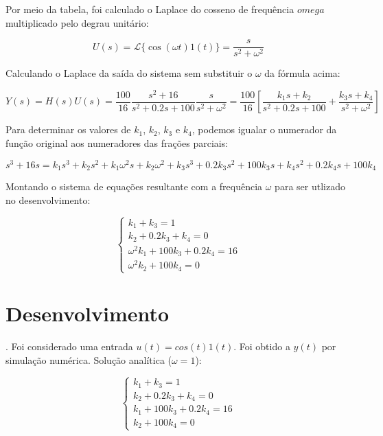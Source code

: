 \documentclass[10pt]{article}
\begin{document}
\quad Por meio da tabela, foi calculado o Laplace do cosseno de frequência $omega$ multiplicado pelo degrau unitário:

\begin{equation}
    U(s) = \mathcal{L}\{ \cos(\omega t) 1(t) \} = \frac{s}{s^2 + \omega^2}
\end{equation}

\quad Calculando o Laplace da saída do sistema sem substituir o $\omega$ da fórmula acima:

\begin{equation}
    Y(s) = H(s)U(s) = \frac{100}{16} \frac{s^2 + 16}{s^2 + 0.2s + 100} \frac{s}{s^2 + \omega^2} = \frac{100}{16} \left[ \frac{k_1s + k_2}{s^2 + 0.2s + 100} + \frac{k_3s + k_4}{s^2 + \omega^2} \right] 
\end{equation}

\quad Para determinar os valores de $k_1$, $k_2$, $k_3$ e $k_4$, podemos igualar o numerador da função original aos numeradores das frações parciais:

\begin{equation}
    s^3 + 16s = k_1s^3 + k_2s^2 + k_1\omega^2 s + k_2\omega^2 + k_3s^3 + 0.2k_3s^2 + 100k_3s + k_4s^2 + 0.2k_4s + 100k_4
\end{equation}

\quad Montando o sistema de equações resultante com a frequência $\omega$ para ser utlizado no desenvolvimento:

\begin{equation}
    \left\{
    \begin{array}{l}
        k_1 + k_3 = 1 \\
        k_2 + 0.2k_3 +k_4 = 0 \\
        \omega^2k_1 + 100k_3 + 0.2k_4 = 16 \\
        \omega^2k_2 + 100k_4 = 0
    \end{array}
    \right. 
\end{equation}

\newpage

\section{Desenvolvimento}

. Foi considerado uma entrada $u(t) = cos(t) 1(t)$. Foi obtido a $y(t)$ por simulação numérica. Solução analítica ($\omega = 1$):

\begin{equation}
    \left\{
    \begin{array}{l}
        k_1 + k_3 = 1 \\
        k_2 + 0.2k_3 +k_4 = 0 \\
        k_1 + 100k_3 + 0.2k_4 = 16 \\
        k_2 + 100k_4 = 0
    \end{array}
    \right. 
\end{equation}
\end{document}
